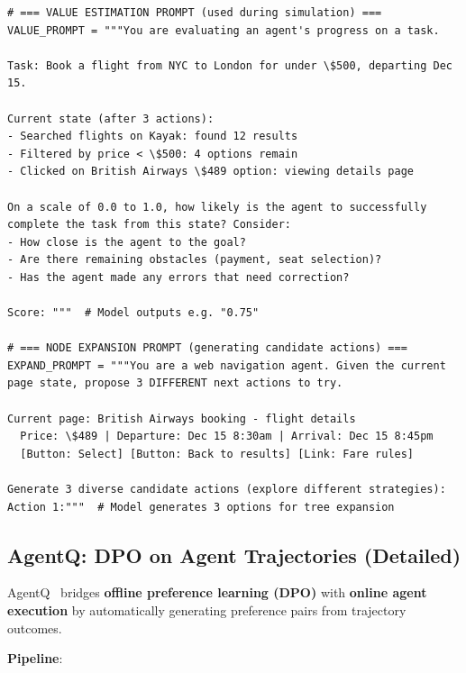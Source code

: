 \begin{examplebox}
\begin{lstlisting}[style=pythonstyle]
# === VALUE ESTIMATION PROMPT (used during simulation) ===
VALUE_PROMPT = """You are evaluating an agent's progress on a task.

Task: Book a flight from NYC to London for under \$500, departing Dec 15.

Current state (after 3 actions):
- Searched flights on Kayak: found 12 results
- Filtered by price < \$500: 4 options remain
- Clicked on British Airways \$489 option: viewing details page

On a scale of 0.0 to 1.0, how likely is the agent to successfully
complete the task from this state? Consider:
- How close is the agent to the goal?
- Are there remaining obstacles (payment, seat selection)?
- Has the agent made any errors that need correction?

Score: """  # Model outputs e.g. "0.75"

# === NODE EXPANSION PROMPT (generating candidate actions) ===
EXPAND_PROMPT = """You are a web navigation agent. Given the current
page state, propose 3 DIFFERENT next actions to try.

Current page: British Airways booking - flight details
  Price: \$489 | Departure: Dec 15 8:30am | Arrival: Dec 15 8:45pm
  [Button: Select] [Button: Back to results] [Link: Fare rules]

Generate 3 diverse candidate actions (explore different strategies):
Action 1:"""  # Model generates 3 options for tree expansion
\end{lstlisting}
\end{examplebox}

\subsection{AgentQ: DPO on Agent Trajectories (Detailed)}
\label{agentq-dpo-on-agent-trajectories-detailed}

AgentQ~\cite{putta2024agentq} bridges \textbf{offline preference learning (DPO)} with \textbf{online agent execution} by automatically generating preference pairs from trajectory outcomes.

\textbf{Pipeline}:

